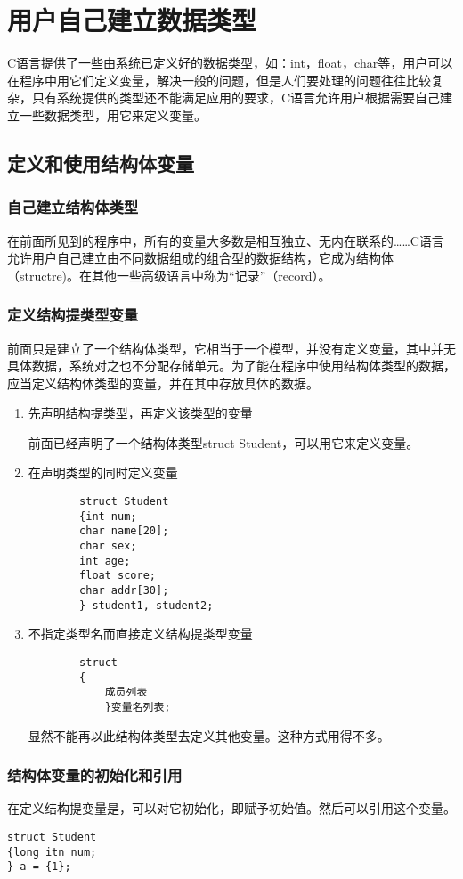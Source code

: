 \chapter{用户自己建立数据类型}
C语言提供了一些由系统已定义好的数据类型，如：int，float，char等，用户可以在程序中用它们定义变量，解决一般的问题，但是人们要处理的问题往往比较复杂，只有系统提供的类型还不能满足应用的要求，C语言允许用户根据需要自己建立一些数据类型，用它来定义变量。
\section{定义和使用结构体变量}
\subsection{自己建立结构体类型}
在前面所见到的程序中，所有的变量大多数是相互独立、无内在联系的……C语言允许用户自己建立由不同数据组成的组合型的数据结构，它成为结构体（structre)。在其他一些高级语言中称为“记录”（record）。
\subsection{定义结构提类型变量}
前面只是建立了一个结构体类型，它相当于一个模型，并没有定义变量，其中并无具体数据，系统对之也不分配存储单元。为了能在程序中使用结构体类型的数据，应当定义结构体类型的变量，并在其中存放具体的数据。
\begin{enumerate}
	\item 先声明结构提类型，再定义该类型的变量

		前面已经声明了一个结构体类型struct Student，可以用它来定义变量。

	\item 在声明类型的同时定义变量
		
		\begin{lstlisting}
		struct Student
		{int num;
		char name[20];
		char sex;
		int age;
		float score;
		char addr[30];
		} student1, student2;
		\end{lstlisting}

	\item 不指定类型名而直接定义结构提类型变量
		\begin{lstlisting}
		struct 
		{
			成员列表
			}变量名列表;
		\end{lstlisting}
		显然不能再以此结构体类型去定义其他变量。这种方式用得不多。
\end{enumerate}
\subsection{结构体变量的初始化和引用}
在定义结构提变量是，可以对它初始化，即赋予初始值。然后可以引用这个变量。
\begin{lstlisting}
struct Student
{long itn num;
} a = {1};
\end{lstlisting}

